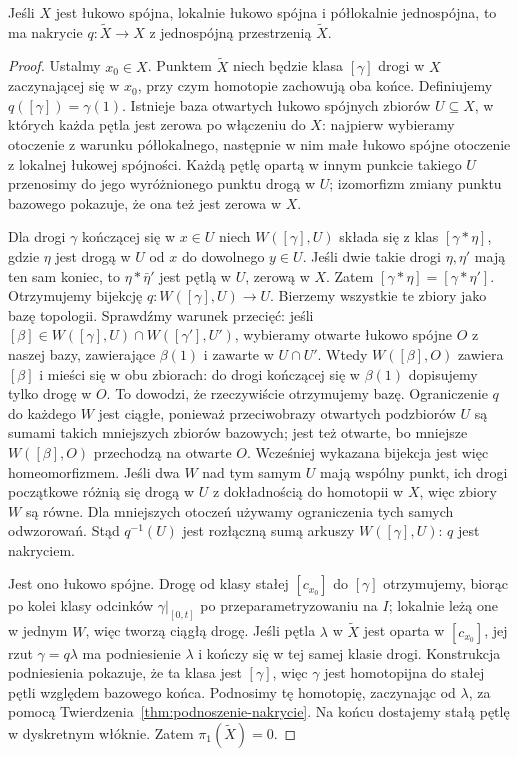 \begin{twierdzenie}
\label{thm:uniwersalne-nakrycie}
Jeśli $X$ jest łukowo spójna, lokalnie
łukowo spójna i półlokalnie jednospójna,
to ma nakrycie $q:\widetilde X\to X$
z jednospójną przestrzenią $\widetilde X$.
\end{twierdzenie}
\begin{proof}
Ustalmy $x_0\in X$. Punktem $\widetilde X$
niech będzie klasa $[\gamma]$ drogi w $X$
zaczynającej się w $x_0$, przy czym
homotopie zachowują oba końce.
Definiujemy $q([\gamma])=\gamma(1)$.
Istnieje baza otwartych łukowo spójnych
zbiorów $U\subseteq X$, w których
każda pętla jest zerowa po włączeniu do $X$:
najpierw wybieramy otoczenie z warunku
półlokalnego, następnie w nim małe
łukowo spójne otoczenie z lokalnej
łukowej spójności. Każdą pętlę opartą w innym punkcie
takiego $U$ przenosimy do jego wyróżnionego punktu drogą w $U$;
izomorfizm zmiany punktu bazowego pokazuje, że ona też jest zerowa w $X$.

Dla drogi $\gamma$ kończącej się w $x\in U$
niech $W([\gamma],U)$ składa się z klas
$[\gamma*\eta]$, gdzie $\eta$ jest drogą
w $U$ od $x$ do dowolnego $y\in U$.
Jeśli dwie takie drogi $\eta,\eta'$
mają ten sam koniec, to
$\eta*\bar\eta'$ jest pętlą w $U$,
zerową w $X$. Zatem $[\gamma*\eta]
=[\gamma*\eta']$. Otrzymujemy bijekcję
$q:W([\gamma],U)\to U$. Bierzemy wszystkie
te zbiory jako bazę topologii. Sprawdźmy warunek przecięć:
jeśli $[\beta]\in W([\gamma],U)\cap W([\gamma'],U')$,
wybieramy otwarte łukowo spójne $O$ z naszej bazy,
zawierające $\beta(1)$ i zawarte w $U\cap U'$.
Wtedy $W([\beta],O)$ zawiera $[\beta]$ i mieści się w obu zbiorach:
do drogi kończącej się w $\beta(1)$ dopisujemy tylko drogę w $O$.
To dowodzi, że rzeczywiście otrzymujemy bazę.
Ograniczenie $q$ do każdego $W$ jest ciągłe, ponieważ przeciwobrazy
otwartych podzbiorów $U$ są sumami takich mniejszych zbiorów bazowych;
jest też otwarte, bo mniejsze $W([\beta],O)$ przechodzą na otwarte $O$.
Wcześniej wykazana bijekcja jest więc homeomorfizmem.
Jeśli dwa $W$ nad tym samym
$U$ mają wspólny punkt, ich drogi początkowe
różnią się drogą w $U$ z dokładnością
do homotopii w $X$, więc zbiory $W$
są równe. Dla mniejszych otoczeń
używamy ograniczenia tych samych odwzorowań.
Stąd $q^{-1}(U)$ jest rozłączną sumą
arkuszy $W([\gamma],U)$: $q$ jest nakryciem.

Jest ono łukowo spójne. Drogę od klasy
stałej $[c_{x_0}]$ do $[\gamma]$
otrzymujemy, biorąc po kolei klasy
odcinków $\gamma|_{[0,t]}$ po
przeparametryzowaniu na $I$; lokalnie
leżą one w jednym $W$, więc tworzą
ciągłą drogę. Jeśli pętla
$\lambda$ w $\widetilde X$ jest oparta
w $[c_{x_0}]$, jej rzut $\gamma=q\lambda$
ma podniesienie $\lambda$ i kończy
się w tej samej klasie drogi.
Konstrukcja podniesienia pokazuje,
że ta klasa jest $[\gamma]$, więc
$\gamma$ jest homotopijna do stałej
pętli względem bazowego końca.
Podnosimy tę homotopię, zaczynając
od $\lambda$, za pomocą
Twierdzenia~\ref{thm:podnoszenie-nakrycie}.
Na końcu dostajemy stałą pętlę
w dyskretnym włóknie. Zatem
$\pi_1(\widetilde X)=0$.
\end{proof}

